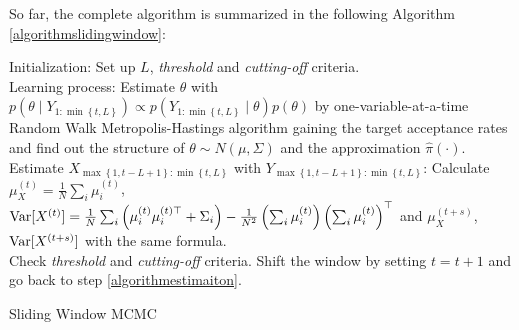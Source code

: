 So far, the complete algorithm is summarized in the following Algorithm \ref{algorithmslidingwindow}: 
\begin{algorithm}[h]
\SetAlgoLined 
Initialization: Set up $L$, \textit{threshold} and  \textit{cutting-off} criteria. \\
Learning process: Estimate $\theta$ with $p\left(\theta\mid Y_{1:\min \left\lbrace t,L\right\rbrace } \right) \propto p\left(Y_{1:\min \left\lbrace t,L\right\rbrace } \mid \theta \right)p\left(\theta \right)$ by one-variable-at-a-time Random Walk Metropolis-Hastings algorithm gaining the target acceptance rates and find out the structure of $\theta\sim N\left(\mu,\Sigma\right)$ and the approximation $\hat{\pi}\left(\cdot\right)$. \label{algorithmlearningsurface}\\
Estimate $X_{ \max\left\lbrace 1,t-L+1 \right\rbrace :\min \left\lbrace t,L\right\rbrace }$ with $Y_{ \max\left\lbrace 1,t-L+1 \right\rbrace :\min \left\lbrace t,L\right\rbrace }$: 
Calculate $\mu_X^{\left(t\right)} = \frac{1}{N} \sum_i \mu_i^{\left(t\right)}$, $\mathrm{Var}\lbrack X^{\left(t\right)}\rbrack = \frac{1}{N} \sum_i \left(\mu_i^{\left(t\right)} \mu_i^{\left(t\right)\top} +\Sigma_i\right) -\frac{1}{N^2} \left(\sum_i  \mu_i^{\left(t\right)}\right) \left(\sum_i \mu_i^{\left(t\right)}\right)^\top$ and $\mu_X^{\left(t+s\right)}$, $\mathrm{Var}\lbrack X^{\left(t+s\right)}\rbrack$ with the same formula.  \\
Check \textit{threshold} and  \textit{cutting-off} criteria. 
Shift the window by setting $t = t+1$ and go back to step \ref{algorithmestimaiton}.
 \caption{Sliding Window MCMC}\label{algorithmslidingwindow}
\end{algorithm}



